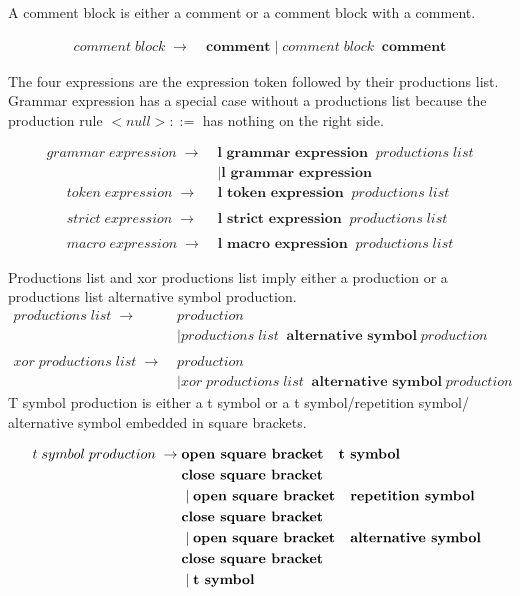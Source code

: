 A comment block is either a comment or a comment block with a comment.

\begin{align*}
    comment\;block\; \rightarrow\; &\textbf{comment}
                \mid comment\;block\;\;\textbf{comment}
\end{align*}

The four expressions are the expression token followed by their productions list. Grammar expression has a special case without a productions list because the production rule $ <null> ::= $ has nothing on the right side. 

\begin{align*}
	grammar\;expression\; \rightarrow\; &\textbf{l grammar expression}\;\;productions\;list \\ 
               &\mid \textbf{l grammar expression} 
\end{align*}
\begin{align*}        
	token\;expression\; \rightarrow\; &\textbf{l token expression} \;\;productions\;list \\ \\
	strict\;expression\; \rightarrow\; &\textbf{l strict expression} \;\;productions\;list \\ \\
	macro\;expression\; \rightarrow\; &\textbf{l macro expression} \;\;productions\;list 
\end{align*}

Productions list and xor productions list imply either a production or a productions list alternative symbol production.
\begin{align*}
        productions\;list\; \rightarrow\; &production \\
               &\mid productions\;list\;\;\textbf{alternative symbol} \;production \\ \\                  
        xor\;productions\;list\; \rightarrow\; &production \\
               &\mid xor\;productions\;list\;\;\textbf{alternative symbol}\;production
\end{align*}
T symbol production is either a t symbol or a t symbol/repetition symbol/ alternative symbol embedded in square brackets.

\begin{align*}
	t\;symbol\;production\; \rightarrow\; & \textbf{open square bracket \; t symbol} \\ &\textbf{close square bracket}\\
               &\mid \textbf{open square bracket \; repetition symbol} \\ &\textbf{close square bracket}\\
               &\mid \textbf{open square bracket \; alternative symbol } \\ &\textbf{close square bracket}\\
               &\mid \textbf{t symbol} 
\end{align*}

